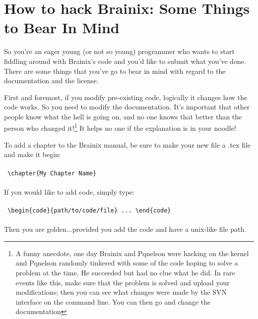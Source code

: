 \chapter{How to hack Brainix: Some Things to Bear In Mind}

So you're an eager young (or not so young) programmer who wants to start fiddling around with Brainix's code and you'd like to submit what you've done. There are some things that you've go to bear in mind with regard to the documentation and the license.

First and foremost, if you modify pre-existing code, logically it changes how the code works. So you need to modify the documentation. It's important that other people know what the hell is going on, and no one knows that better than the person who changed it!\footnote{A funny anecdote, one day Brainix and Pqnelson were hacking on the kernel and Pqnelson randomly tinkered with some of the code hoping to solve a problem at the time. He succeeded but had no clue what he did. In rare events like this, make sure that the problem is solved and upload your modifications; then you can see what changes were made by the SVN interface on the command line. You can then go and change the documentation} It helps no one if the explanation is in your noodle!

To add a chapter to the Brainix manual, be sure to make your new file a .tex file and make it begin:
\\
\\
\verb| \chapter{My Chapter Name} |
\\
\\
If you would like to add code, simply type:
\\
\\
\verb| \begin{code}{path/to/code/file} ... \end{code}|
\\
\\
Then you are golden...provided you add the code and have a unix-like file path.

